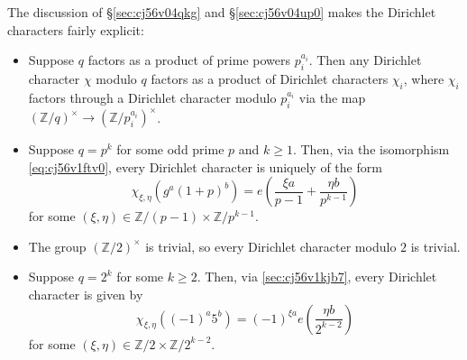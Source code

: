 \documentclass[reqno]{amsart}  \numberwithin{theorem}{section} \numberwithin{equation}{section}
\begin{document}
The discussion of \S\ref{sec:cj56v04qkg} and \S\ref{sec:cj56v04up0} makes the Dirichlet characters fairly explicit:
\begin{itemize}
\item Suppose $q$ factors as a product of prime powers $p_i^{a_i}$.  Then any Dirichlet character $\chi$ modulo $q$ factors as a product of Dirichlet characters $\chi_i$, where $\chi_i$ factors through a Dirichlet character modulo $p_i^{a_i}$ via the map $(\mathbb{Z} / q )^\times \rightarrow (\mathbb{Z} / p_i^{a_i })^\times$.
\item Suppose $q = p^k$ for some odd prime $p$ and $k \geq 1$.  Then, via the isomorphism \eqref{eq:cj56v1ftv0}, every Dirichlet character is uniquely of the form
  \begin{equation}\label{eq:cj56v1takk}
    \chi_{\xi, \eta } (g^a (1 + p)^b ) = e \left( \frac{\xi a}{p- 1} + \frac{ \eta b}{p^{k-1}} \right)
  \end{equation}
  for some $(\xi,\eta) \in \mathbb{Z} / (p - 1 ) \times \mathbb{Z} / p^{k - 1}$.
\item The group $(\mathbb{Z} / 2)^\times$ is trivial, so every Dirichlet character modulo $2$ is trivial.
\item Suppose $q = 2^k$ for some $k \geq 2$.  Then, via \ref{sec:cj56v1kjb7}, every Dirichlet character is given by
  \begin{equation*}
    \chi_{\xi, \eta } ((-1)^a 5^b ) = (-1)^{\xi a} e \left( \frac{\eta b}{2^{k - 2}} \right)
  \end{equation*}
  for some $(\xi, \eta ) \in \mathbb{Z} / 2 \times \mathbb{Z} / 2^{k - 2}$.
\end{itemize}
\end{document}
